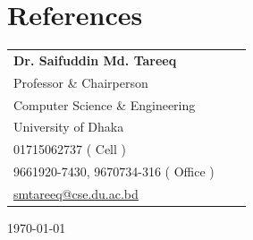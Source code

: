 \documentclass[a4paper]{article}
\begin{document}
\section{References}
\begin{table}[h]
\begin{tabular}{@{}lll@{}}
  \textbf{Dr. Saifuddin Md. Tareeq}\\
  Professor \& Chairperson\\
Computer Science \& Engineering\\
University of Dhaka\\
\faPhone{} 01715062737 ( Cell )\\
\faPhone{} 9661920-7430, 9670734-316 ( Office )\\
\faEnvelopeO{} \href{mailto:smtareeq@cse.du.ac.bd}{smtareeq@cse.du.ac.bd}\\
\end{tabular}
\end{table}

\noindent \today
\end{document}
